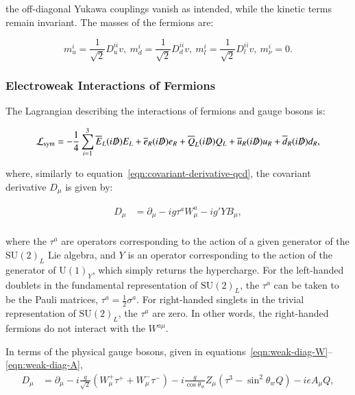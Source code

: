 the off-diagonal Yukawa couplings vanish as intended, while the kinetic terms remain invariant. The masses of the fermions are:

\begin{equation}
	m_u^i = \frac{1}{\sqrt{2}} D_u^{ii}v,\ m_d^i = \frac{1}{\sqrt{2}} D_d^{ii}v,\ m_l^i = \frac{1}{\sqrt{2}} D_l^{ii}v,\ m_{\nu}^i = 0.
\end{equation}


\subsubsection{Electroweak Interactions of Fermions}
The Lagrangian describing the interactions of fermions and gauge bosons is:

\begin{equation}\label{eqn:electroweak-lagrangian}
	\mathcal{L}_{\mathrm{sym}} =  -\frac{1}{4} \sum_{i=1}^3  \overline{E}_L (i\slashed{D}) E_L + \overline{e}_R(i\slashed{D})e_R + \overline{Q}_L(i\slashed{D})Q_L + \overline{u}_R(i\slashed{D})u_R+\overline{d}_R(i\slashed{D})d_R,
\end{equation}

where, similarly to equation~\ref{eqn:covariant-derivative-qcd}, the covariant derivative $D_{\mu}$ is given by:

\begin{align}\label{eqn:covariant-derivative-ew}
	D_{\mu} &= \partial_{\mu} - i g \tau^a W^{a}_{\mu} - i g' Y B_{\mu}, \\
\end{align}

where the $\tau^a$ are operators corresponding to the action of a given generator of the $\mathrm{SU}(2)_L$ Lie algebra, and $Y$ is an operator corresponding to the action of the generator of $\mathrm{U}(1)_Y$, which simply returns the hypercharge. For the left-handed doublets in the fundamental representation of $\mathrm{SU}(2)_L$, the $\tau^a$ can be taken to be the Pauli matrices, $\tau^a=\frac12 \sigma^a$. For right-handed singlets in the trivial representation of $\mathrm{SU}(2)_L$, the $\tau^a$ are zero. In other words, the right-handed fermions do not interact with the $W^{a\mu}$. 

In terms of the physical gauge bosons, given in equations~\ref{eqn:weak-diag-W}--\ref{eqn:weak-diag-A}, 
\begin{align}
	D_{\mu} &= \partial_{\mu} - i \frac{g}{\sqrt{2}}\left(W_{\mu}^+ \tau^+ + W_{\mu}^- \tau^-\right) - i\frac{g}{\cos\theta_w} Z_{\mu}\left(\tau^3 - \sin^2\theta_w Q\right) - i e A_{\mu} Q,
\end{align}

